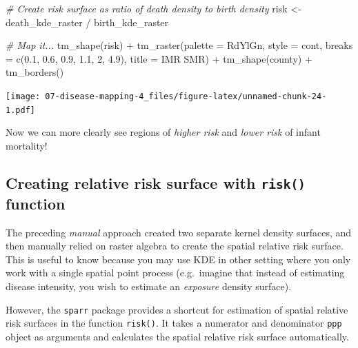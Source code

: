 \documentclass[
]{book}
\newenvironment{Shaded}{\begin{snugshade}}{\end{snugshade}}
\newcommand{\AttributeTok}[1]{\textcolor[rgb]{0.77,0.63,0.00}{#1}}
\newcommand{\CommentTok}[1]{\textcolor[rgb]{0.56,0.35,0.01}{\textit{#1}}}
\newcommand{\DecValTok}[1]{\textcolor[rgb]{0.00,0.00,0.81}{#1}}
\newcommand{\FloatTok}[1]{\textcolor[rgb]{0.00,0.00,0.81}{#1}}
\newcommand{\FunctionTok}[1]{\textcolor[rgb]{0.00,0.00,0.00}{#1}}
\newcommand{\NormalTok}[1]{#1}
\newcommand{\OtherTok}[1]{\textcolor[rgb]{0.56,0.35,0.01}{#1}}
\newcommand{\SpecialCharTok}[1]{\textcolor[rgb]{0.00,0.00,0.00}{#1}}
\newcommand{\StringTok}[1]{\textcolor[rgb]{0.31,0.60,0.02}{#1}}
\begin{document}
\begin{Shaded}
\begin{Highlighting}[]
\CommentTok{\# Create risk surface as ratio of death density to birth density}
\NormalTok{risk }\OtherTok{\textless{}{-}}\NormalTok{ death\_kde\_raster }\SpecialCharTok{/}\NormalTok{ birth\_kde\_raster}

\CommentTok{\# Map it...}
\FunctionTok{tm\_shape}\NormalTok{(risk) }\SpecialCharTok{+} 
  \FunctionTok{tm\_raster}\NormalTok{(}\AttributeTok{palette =} \StringTok{\textquotesingle{}{-}RdYlGn\textquotesingle{}}\NormalTok{,}
            \AttributeTok{style =} \StringTok{\textquotesingle{}cont\textquotesingle{}}\NormalTok{,}
            \AttributeTok{breaks =} \FunctionTok{c}\NormalTok{(}\FloatTok{0.1}\NormalTok{, }\FloatTok{0.6}\NormalTok{, }\FloatTok{0.9}\NormalTok{,   }\FloatTok{1.1}\NormalTok{, }\DecValTok{2}\NormalTok{, }\FloatTok{4.9}\NormalTok{),}
            \AttributeTok{title =} \StringTok{\textquotesingle{}IMR SMR\textquotesingle{}}\NormalTok{)  }\SpecialCharTok{+}
\FunctionTok{tm\_shape}\NormalTok{(county) }\SpecialCharTok{+}
  \FunctionTok{tm\_borders}\NormalTok{()}
\end{Highlighting}
\end{Shaded}

\texttt{[image: 07-disease-mapping-4\_files/figure-latex/unnamed-chunk-24-1.pdf]}

Now we can more clearly see regions of \emph{higher risk} and \emph{lower risk} of infant mortality!

\hypertarget{creating-relative-risk-surface-with-risk-function}{%
\subsection{\texorpdfstring{Creating relative risk surface with \texttt{risk()} function}{Creating relative risk surface with risk() function}}\label{creating-relative-risk-surface-with-risk-function}}

The preceding \emph{manual} approach created two separate kernel density surfaces, and then manually relied on raster algebra to create the spatial relative risk surface. This is useful to know because you may use KDE in other setting where you only work with a single spatial point process (e.g.~imagine that instead of estimating disease intensity, you wish to estimate an \emph{exposure} density surface).

However, the \texttt{sparr} package provides a shortcut for estimation of spatial relative risk surfaces in the function \texttt{risk()}. It takes a numerator and denominator \texttt{ppp} object as arguments and calculates the spatial relative risk surface automatically.
\end{document}
